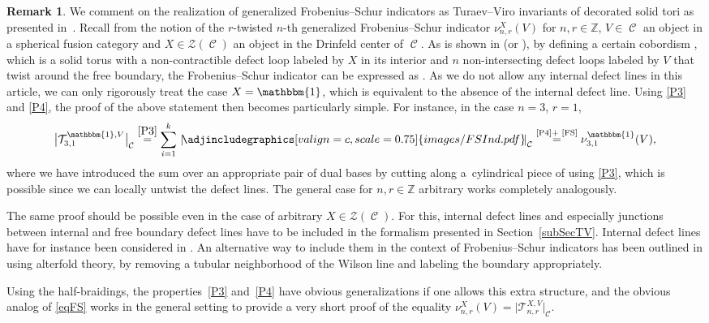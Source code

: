 \documentclass[10pt,a4paper]{amsart}
\DeclareMathOperator{\calc}{\mathcal{C}}
\numberwithin{equation}{section}
\theoremstyle{definition}
\newtheorem{Remark}[Remark]{Remark}
\begin{document}
\begin{Remark}
 We comment on the realization of generalized Frobenius--Schur indicators as Turaev--Viro invariants of decorated solid tori as presented in~\cite{FS}. Recall from \cite[Definition~2.1]{NS} the notion of the $r$-twisted $n$-th generalized Frobenius--Schur indicator $\nu_{n, r}^X(V)$ for $n, r \in \mathbb{Z}$, $V \in \calc$ an object in a spherical fusion category and $X \in \mathcal{Z}(\calc)$ an object in the Drinfeld center of $\calc$. As is shown in \cite[Proposition 14]{FS} (or \cite[Theorem~5.0.1]{F}), by defining a certain cobordism , which is a solid torus with a non-contractible defect loop labeled by $X$ in its interior and $n$ non-intersecting defect loops labeled by $V$ that twist around the free boundary, the Frobenius--Schur indicator can be expressed as \smash{$\nu_{n, r}^X(V) = \bigl|\mathcal{T}_{n,r}^{X, V}\bigr|_{\calc}$}. As we do not allow any internal defect lines in this article, we can only rigorously treat the case $X = \mathbbm{1}$, which is equivalent to the absence of the internal defect line. Using \ref{P3} and \ref{P4}, the proof of the above statement then becomes particularly simple. For instance, in the case $n = 3$, $r = 1$,
 \begin{align}
 \label{eqFS}
 \bigl|\mathcal{T}_{3, 1}^{\mathbbm{1}, V}\bigr|_{\calc} \overset{\rm \ref{P3}}{=} \sum_{i = 1}^k \, \left| \! \adjincludegraphics[valign=c, scale = 0.75]{images/FSInd.pdf} \! \right|_{\calc} \overset{\text{\ref{P4}} + \text{ \cite[(2.4)]{FS}}}{=} \nu_{3, 1}^{\mathbbm{1}}(V),
 \end{align}
 where we have introduced the sum over an appropriate pair of dual bases by cutting along a~cylindrical piece of  using \ref{P3}, which is possible since we can locally untwist the defect lines. The general case for $n, r \in \mathbb{Z}$ arbitrary works completely analogously.

 The same proof should be possible even in the case of arbitrary $X \in \mathcal{Z}(\calc)$. For this, internal defect lines and especially junctions between internal and free boundary defect lines have to be included in the formalism presented in Section~\ref{subSecTV}. Internal defect lines have for instance been considered in \cite{F, FS, TV}. An alternative way to include them in the context of Frobenius--Schur indicators has been outlined in \cite[Section~5]{LMWW} using alterfold theory, by removing a tubular neighborhood of the Wilson line and labeling the boundary appropriately.

 Using the half-braidings, the properties~\ref{P3} and~\ref{P4} have obvious generalizations if one allows this extra structure, and the obvious analog of \eqref{eqFS} works in the general setting to provide a very short proof of the equality $\nu_{n, r}^X(V) = \bigl|\mathcal{T}_{n,r}^{X, V}\bigr|_{\calc}$.
\end{Remark}
\end{document}

